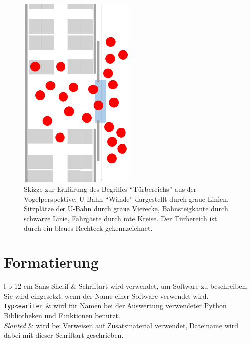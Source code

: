  \begin{figure}[H]
	\centering
		\includegraphics[angle=270, width=0.5\textwidth]{pictures/introduction/defenitions/example_doorarea.png}
	\caption{Skizze zur Erklärung des Begriffes "`Türbereichs"' aus der Vogelperspektive: U-Bahn "`Wände"' dargestellt durch graue Linien, Sitzplätze der U-Bahn durch graue Vierecke, Bahnsteigkante durch schwarze Linie, Fahrgäste durch rote Kreise. Der Türbereich ist durch ein blaues Rechteck gekennzeichnet.}
	\label{fig:Doorarea}
\end{figure} 
\section{Formatierung}
\begin{table}[H]
	\centering
		\begin{tabular}{ l p {12 cm}}
		\textsf{Sans Sherif}	& Schriftart wird verwendet, um Software zu beschreiben. Sie wird eingesetzt, wenn der Name einer Software verwendet wird.\\
		\texttt{Typ<ewriter}	& wird für Namen bei der Auswertung verwendeter Python Bibliotheken und Funktionen benutzt. \\
		\textsl{Slanted}	& wird bei Verweisen auf Zusatzmaterial verwendet, Dateiname wird dabei mit dieser Schriftart geschrieben.
		\end{tabular}
\end{table}